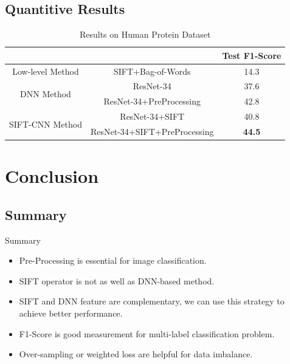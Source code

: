\documentclass[unknownkeysallowed]{beamer}
\begin{document}
	\subsection{Quantitive Results}
	\begin{frame}
	\begin{table}[]
		\centering
		 \caption{Results on Human Protein Dataset}
		\label{my-label}
		\begin{tabular}{|c|c|c|}
			\hline
			&  & Test F1-Score \\ \hline
			\multirow{1}{*}{Low-level Method} & SIFT+Bag-of-Words     & 14.3                \\ \hline 
			\multirow{2}{*}{DNN Method}   & ResNet-34    & 37.6    \\ \cline{2-3} 
			   & ResNet-34+PreProcessing & 42.8  \\ \hline
			\multirow{2}{*}{SIFT-CNN Method}& ResNet-34+SIFT & 40.8 \\ \cline{2-3} 
			& ResNet-34+SIFT+PreProcessing &  \textbf{44.5} \\ \hline
		\end{tabular}
	\end{table}
	\end{frame}
%		
	
	\section{Conclusion}
	\subsection{Summary}
	\begin{frame}
		\begin{block}{Summary}
		\begin{itemize}
			\item Pre-Processing is essential for image classification.
			\item SIFT operator is not as well as DNN-based method.
			\item SIFT and DNN feature are complementary, we can use this strategy to achieve better performance.
			\item F1-Score is good measurement for multi-label classification problem.
			\item Over-sampling\cite{chawla2002smote} or weighted loss are helpful for data imbalance.
		\end{itemize}	
		\end{block}
	\end{frame}
	
\end{document}
